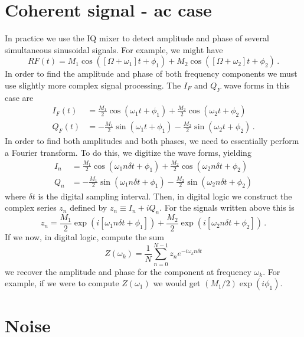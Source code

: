 \section{Coherent signal - ac case}

In practice we use the IQ mixer to detect amplitude and phase of several simultaneous sinusoidal signals.
For example, we might have
\begin{equation}
RF(t) = M_1 \cos([\Omega + \omega_1] t + \phi_1 ) + M_2 \cos([\Omega + \omega_2] t + \phi_2) \, .
\end{equation}
In order to find the amplitude and phase of both frequency components we must use slightly more complex signal processing.
The $I_F$ and $Q_F$ wave forms in this case are
\begin{align}
I_F(t) &= \frac{M_1}{2} \cos(\omega_1 t + \phi_1) + \frac{M_2}{2} \cos(\omega_2 t + \phi_2) \\
Q_F(t) &= -\frac{M_1}{2} \sin(\omega_1 t + \phi_1) - \frac{M_2}{2} \sin(\omega_2 t + \phi_2) \, .
\end{align}
In order to find both amplitudes and both phases, we need to essentially perform a Fourier transform.
To do this, we digitize the wave forms, yielding
\begin{align}
I_n &= \frac{M_1}{2} \cos(\omega_1 n \delta t + \phi_1) + \frac{M_2}{2} \cos(\omega_2 n \delta t + \phi_2) \\
Q_n &= - \frac{M_1}{2} \sin(\omega_1 n \delta t + \phi_1) - \frac{M_2}{2} \sin(\omega_2 n \delta t + \phi_2)
\end{align}
where $\delta t$ is the digital sampling interval.
Then, in digital logic we construct the complex series $z_n$ defined by $z_n \equiv I_n + i Q_n$.
For the signals written above this is
\begin{equation}
z_n =
\frac{M_1}{2} \exp \left( i \left[ \omega_1 n \delta t + \phi_1 \right] \right)
+ \frac{M_2}{2} \exp \left( i \left[ \omega_2 n \delta t + \phi_2 \right] \right) \, .
\end{equation}
If we now, in digital logic, compute the sum
\begin{equation}
Z(\omega_k) = \frac{1}{N}\sum_{n=0}^{N-1} z_n e^{-i \omega_k n \delta t}
\end{equation}
we recover the amplitude and phase for the component at frequency $\omega_k$.
For example, if we were to compute $Z(\omega_1)$ we would get $(M_1/2) \exp(i \phi_1)$.


\section{Noise}

